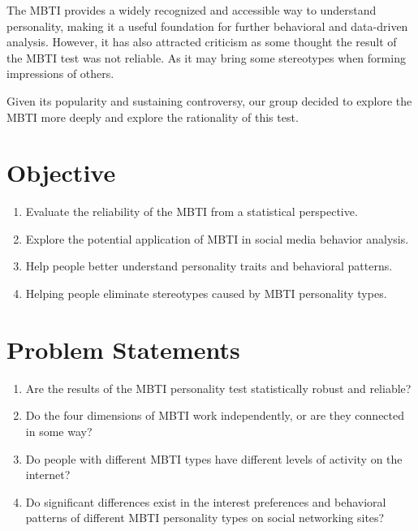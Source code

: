 \documentclass[12pt]{article}
\numberwithin{figure}{section}  %
\begin{document}
	The MBTI provides a widely recognized and accessible way to understand personality, making it a useful foundation for further behavioral and data-driven analysis. However, it has also attracted criticism as some thought the result of the MBTI test was not reliable. As it may bring some stereotypes when forming impressions of others. 
	
	Given its popularity and sustaining controversy, our group decided to explore the MBTI more deeply and explore the rationality of this test.
	
	
	\section{Objective}
	\begin{enumerate} 
		\item Evaluate the reliability of the MBTI from a statistical
		perspective.    
		\item Explore the potential application of MBTI in
		social media behavior analysis.    
		\item Help people better understand personality traits and behavioral
		patterns.    
		\item Helping people eliminate stereotypes caused by MBTI personality
		types.
	\end{enumerate}
	
	\section{Problem Statements}
	\begin{enumerate}
		\item Are the results of the MBTI personality test statistically robust
		and reliable?
		\item Do the four dimensions of MBTI work independently, or are they
		connected in some way?
		\item Do people with different MBTI types have different levels of
		activity on the internet?
		\item Do significant differences exist in the interest preferences and
		behavioral patterns of different MBTI personality types on social
		networking sites?
	\end{enumerate}
	
\end{document}
